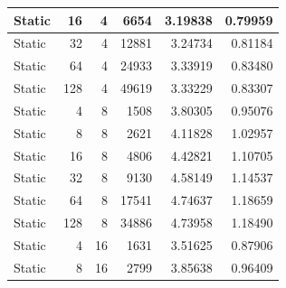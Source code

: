 \documentclass[journal,transmag]{IEEEtran}
\begin{document}
\begin{table}[h]
\begin{tabular}{|l|r|r|r|r|r|}
		Static        & 16                           & 4                            & 6654                              & 3.19838                       & 0.79959                         \\ \hline
		Static        & 32                           & 4                            & 12881                             & 3.24734                       & 0.81184                         \\ \hline
		Static        & 64                           & 4                            & 24933                             & 3.33919                       & 0.83480                         \\ \hline
		Static        & 128                          & 4                            & 49619                             & 3.33229                       & 0.83307                         \\ \hline
		Static        & 4                            & 8                            & 1508                              & 3.80305                       & 0.95076                         \\ \hline
		Static        & 8                            & 8                            & 2621                              & 4.11828                       & 1.02957                         \\ \hline
		Static        & 16                           & 8                            & 4806                              & 4.42821                       & 1.10705                         \\ \hline
		Static        & 32                           & 8                            & 9130                              & 4.58149                       & 1.14537                         \\ \hline
		Static        & 64                           & 8                            & 17541                             & 4.74637                       & 1.18659                         \\ \hline
		Static        & 128                          & 8                            & 34886                             & 4.73958                       & 1.18490                         \\ \hline
		Static        & 4                            & 16                           & 1631                              & 3.51625                       & 0.87906                         \\ \hline
		Static        & 8                            & 16                           & 2799                              & 3.85638                       & 0.96409                         \\ \hline

\end{tabular}
\end{table}
\end{document}
